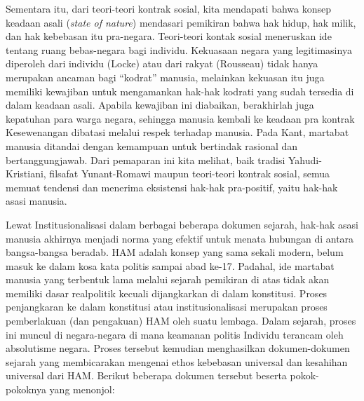 \documentclass[11pt,twoside,a5paper,openany]{memoir}
\begin{document}
Sementara itu, dari teori-teori kontrak sosial, kita mendapati bahwa
konsep keadaan asali (\emph{state of nature}) mendasari pemikiran bahwa
hak hidup, hak milik, dan hak kebebasan itu pra-negara. Teori-teori
kontak sosial meneruskan ide tentang ruang bebas-negara bagi individu.
Kekuasaan negara yang legitimasinya diperoleh dari individu (Locke) atau
dari rakyat (Rousseau) tidak hanya merupakan ancaman bagi ``kodrat''
manusia, melainkan kekuasan itu juga memiliki kewajiban untuk
mengamankan hak-hak kodrati yang sudah tersedia di dalam keadaan asali.
Apabila kewajiban ini diabaikan, berakhirlah juga kepatuhan para warga
negara, sehingga manusia kembali ke keadaan pra kontrak Kesewenangan
dibatasi melalui respek terhadap manusia. Pada Kant, martabat manusia
ditandai dengan kemampuan untuk bertindak rasional dan bertanggungjawab.
Dari pemaparan ini kita melihat, baik tradisi Yahudi-Kristiani, filsafat
Yunant-Romawi maupun teori-teori kontrak sosial, semua memuat tendensi
dan menerima eksistensi hak-hak pra-positif, yaitu hak-hak asasi
manusia.

Lewat Institusionalisasi dalam berbagai beberapa dokumen sejarah,
hak-hak asasi manusia akhirnya menjadi norma yang efektif untuk menata
hubungan di antara bangsa-bangsa beradab. HAM adalah konsep yang sama
sekali modern, belum masuk ke dalam kosa kata politis sampai abad ke-17.
Padahal, ide martabat manusia yang terbentuk lama melalui sejarah
pemikiran di atas tidak akan memiliki dasar realpolitik kecuali
dijangkarkan di dalam konstitusi. Proses penjangkaran ke dalam
konstitusi atau institusionalisasi merupakan proses pemberlakuan (dan
pengakuan) HAM oleh suatu lembaga. Dalam sejarah, proses ini muncul di
negara-negara di mana keamanan politis Individu terancam oleh
absolutisme negara. Proses tersebut kemudian menghasilkan
dokumen-dokumen sejarah yang membicarakan mengenai ethos kebebasan
universal dan kesahihan universal dari HAM. Berikut beberapa dokumen
tersebut beserta pokok-pokoknya yang menonjol:
\end{document}
